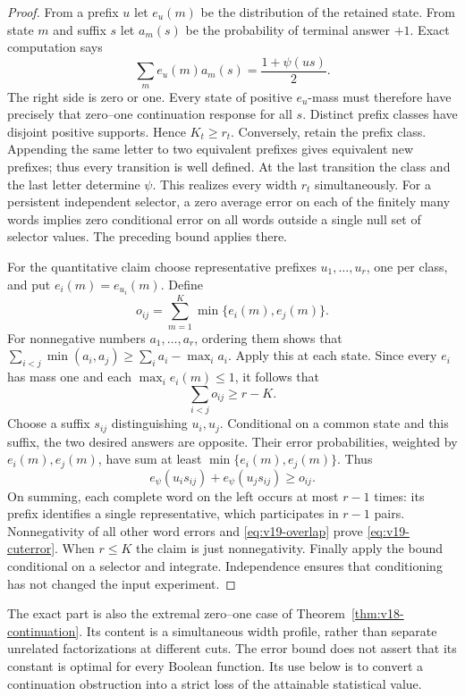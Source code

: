 \begin{proof}
From a prefix $u$ let $e_u(m)$ be the distribution of the retained state.
From state $m$ and suffix $s$ let $a_m(s)$ be the probability of terminal
answer $+1$. Exact computation says
\[
 \sum_m e_u(m)a_m(s)=\frac{1+\psi(us)}2.
\]
The right side is zero or one. Every state of positive $e_u$-mass must
therefore have precisely that zero--one continuation response for all $s$.
Distinct prefix classes have disjoint positive supports. Hence $K_t\ge r_t$.
Conversely, retain the prefix class. Appending the same letter to two
equivalent prefixes gives equivalent new prefixes; thus every transition
is well defined. At the last transition the class and the last letter
determine $\psi$. This realizes every width $r_t$ simultaneously.
For a persistent independent selector, a zero average error on each of the
finitely many words implies zero conditional error on all words outside a
single null set of selector values. The preceding bound applies there.

For the quantitative claim choose representative prefixes $u_1,\ldots,u_r$,
one per class, and put $e_i(m)=e_{u_i}(m)$. Define
\[
 o_{ij}=\sum_{m=1}^K\min\{e_i(m),e_j(m)\}.
\]
For nonnegative numbers $a_1,\ldots,a_r$, ordering them shows that
$\sum_{i<j}\min(a_i,a_j)\ge\sum_i a_i-\max_i a_i$.
Apply this at each state. Since every $e_i$ has mass one and each
$\max_i e_i(m)\le1$, it follows that
\begin{equation}\label{eq:v19-overlap}
 \sum_{i<j}o_{ij}\ge r-K.
\end{equation}
Choose a suffix $s_{ij}$ distinguishing $u_i,u_j$. Conditional on a common
state and this suffix, the two desired answers are opposite. Their error
probabilities, weighted by $e_i(m),e_j(m)$, have sum at least
$\min\{e_i(m),e_j(m)\}$. Thus
\[
 e_\psi(u_i s_{ij})+e_\psi(u_j s_{ij})\ge o_{ij}.
\]
On summing, each complete word on the left occurs at most $r-1$ times:
its prefix identifies a single representative, which participates in
$r-1$ pairs. Nonnegativity of all other word errors and
\eqref{eq:v19-overlap} prove \eqref{eq:v19-cuterror}. When $r\le K$ the
claim is just nonnegativity. Finally apply the bound conditional on a
selector and integrate. Independence ensures that conditioning has not
changed the input experiment.
\end{proof}

The exact part is also the extremal zero--one case of
Theorem~\ref{thm:v18-continuation}. Its content is a simultaneous width
profile, rather than separate unrelated factorizations at different cuts.
The error bound does not assert that its constant is optimal for every
Boolean function. Its use below is to convert a continuation obstruction
into a strict loss of the attainable statistical value.

